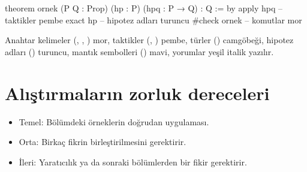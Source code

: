 \begin{leankod}
theorem ornek (P Q : Prop) (hp : P) (hpq : P → Q) : Q := by
  apply hpq   -- taktikler pembe
  exact hp    -- hipotez adları turuncu
#check ornek  -- komutlar mor
\end{leankod}

\noindent
Anahtar kelimeler (, , ) mor,
taktikler (, ) pembe, türler
() camgöbeği, hipotez adları () turuncu,
mantık sembolleri (\lc{\textcolor{leansym}{→ ∧ ∨ ⊢}}) mavi, yorumlar
yeşil italik yazılır.

\section*{Alıştırmaların zorluk dereceleri}

\begin{itemize}
  \item {}\quad Temel: Bölümdeki örneklerin doğrudan uygulaması.
  \item {}\quad Orta: Birkaç fikrin birleştirilmesini gerektirir.
  \item {}\quad İleri: Yaratıcılık ya da sonraki bölümlerden bir fikir gerektirir.
\end{itemize}
